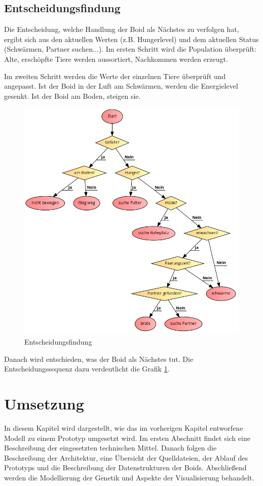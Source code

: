 \documentclass[draft=false
              ,paper=a4
              ,twoside=false
              ,fontsize=11pt
              ,headsepline
              ,BCOR10mm
              ,DIV11
              ,bibtotoc
              ,liststotoc
              ]{scrbook}
\begin{document}
\section{Entscheidungsfindung}
Die Entscheidung, welche Handlung der Boid als Nächstes zu verfolgen hat, ergibt sich aus den aktuellen Werten (z.B. Hungerlevel) und dem aktuellen Status (Schwärmen, Partner suchen...). Im ersten Schritt wird die Population überprüft: Alte, erschöpfte Tiere werden aussortiert, Nachkommen werden erzeugt.

Im zweiten Schritt werden die Werte der einzelnen Tiere überprüft und angepasst. Ist der Boid in der Luft am Schwärmen, werden die Energielevel gesenkt. Ist der Boid am Boden, steigen sie.

\begin{figure}[!h]
\centering
\includegraphics[scale=0.6]{code2flow/entscheidungsfindung.png}
\caption{Entscheidungsfindung}
\label{entscheidung}
\end{figure}

Danach wird entschieden, was der Boid als Nächstes tut. Die Entscheidungssequenz dazu verdeutlicht die Grafik \ref{entscheidung}.

\chapter{Umsetzung}\label{umsetzung}
In diesem Kapitel wird dargestellt, wie das im vorherigen Kapitel entworfene Modell zu einem Prototyp umgesetzt wird. Im ersten Abschnitt findet sich eine Beschreibung der eingesetzten technischen Mittel. Danach folgen die Beschreibung der Architektur, eine Übersicht der Quelldateien, der Ablauf des Prototyps und die Beschreibung der Datenstrukturen der Boids. Abschließend werden die Modellierung der Genetik und Aspekte der Visualisierung behandelt.
\end{document}
